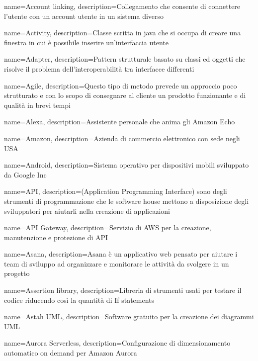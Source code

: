 {
name={Account linking},
description={Collegamento che consente di connettere l’utente con un account utente in un sistema diverso}
}

{
	name={Activity},
	description={Classe scritta in java che si occupa di creare una finestra in cui è possibile inserire un'interfaccia utente}
}

{
	name={Adapter},
	description={Pattern strutturale basato su classi ed oggetti che risolve il problema dell'interoperabilità tra interfacce differenti}
}

{
name={Agile},
description={Questo tipo di metodo prevede un approccio poco strutturato e con lo scopo di consegnare al cliente un prodotto funzionante e di qualità in brevi tempi}
}

{
name={Alexa},
description={Assistente personale che anima gli Amazon Echo}
}

{
name={Amazon},
description={Azienda di commercio elettronico con sede negli USA}
}

{
name={Android},
description={Sistema operativo per dispositivi mobili sviluppato da Google Inc}
}

{
name={API},
description={(Application Programming Interface) sono degli strumenti di programmazione che le software house mettono a disposizione degli sviluppatori per aiutarli
nella creazione di applicazioni}
}

{
name={API Gateway},
description={Servizio di AWS per la creazione, manutenzione e protezione di API}
}

{
name={Asana},
description={Asana è un applicativo web pensato per aiutare i team di sviluppo ad organizzare e monitorare le attività da svolgere in un progetto}
}

{
	name={Assertion library},
	description={Libreria di strumenti usati per testare il codice riducendo così la quantità di If statements}
}

{
name={Astah UML},
description={Software gratuito per la creazione dei diagrammi UML}
}

{
name={Aurora Serverless},
description={Configurazione di dimensionamento automatico on demand per Amazon Aurora}
}

